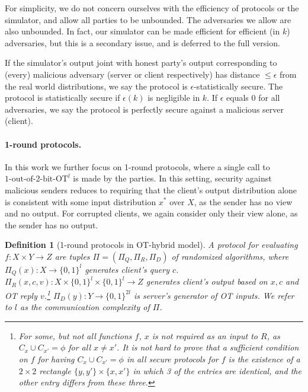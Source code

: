 \documentclass[a4paper]{article}
\newtheorem{definition}{Definition}[section]
\newcommand{\OT}[2]{#1\text{-out-of-}#2\text{-bit-OT}}
\begin{document}
For simplicity, we do not concern ourselves with the efficiency 
of protocols or the simulator, and allow all parties to be unbounded.
The adversaries we allow are also unbounded.
In fact, our simulator can be made efficient for efficient (in $k$) adversaries, but this is a secondary issue, and is deferred to the full version.

If the simulator's output joint with honest party's output
corresponding to (every) malicious adversary (server or client respectively) has distance $\leq \epsilon$ from the real world distributions, we say the protocol is $\epsilon$-statistically secure. The protocol is statistically secure if $\epsilon(k)$ is negligible in $k$. If $\epsilon$ equals 0 for all adversaries, we say the protocol is perfectly secure against a malicious server (client).

\paragraph{1-round protocols.}

In this work we further focus on 1-round protocols, where a single call to ${\OT{1}{2}}^l$ is made by the parties.
In this setting, security against malicious senders reduces to requiring that the 
client's output distribution alone is consistent with some input distribution $x^*$ over $X$, as the sender has no view and no output.
For corrupted clients, we again consider only their view alone, as the sender has no output. 

\begin{definition}[1-round protocols in OT-hybrid model]\label{def-prot}
	A protocol for evaluating $f:X\times Y\rightarrow Z$ are tuples $\Pi=(\Pi_Q,\Pi_R,\Pi_D)$ of randomized algorithms, where $\Pi_Q(x):X\rightarrow \{0,1\}^l$ generates client's query $c$. $\Pi_R(x,c,v):X\times\{0,1\}^l\times  \{0,1\}^l\rightarrow Z$ generates client's output based on $x,c$ and OT reply $v$.\footnote{For some, but not all functions $f$, $x$ is not required as an input to $R$, as $C_x\cup C_{x'}=\phi$ for all $x\neq x'$. It is not hard to prove that a sufficient condition on $f$ for having $C_x\cup C_{x'}=\phi$ in all secure protocols for $f$ is the existence of a $2\times 2$ rectangle $\{y,y'\}\times\{x,x'\}$ in which 3 of the entries are identical, and the other entry differs from these three.} $\Pi_D(y):Y\rightarrow \{0,1\}^{2l}$ is server's generator of OT inputs. We refer to $l$ as the communication complexity of $\Pi$.
\end{definition}
\end{document}

